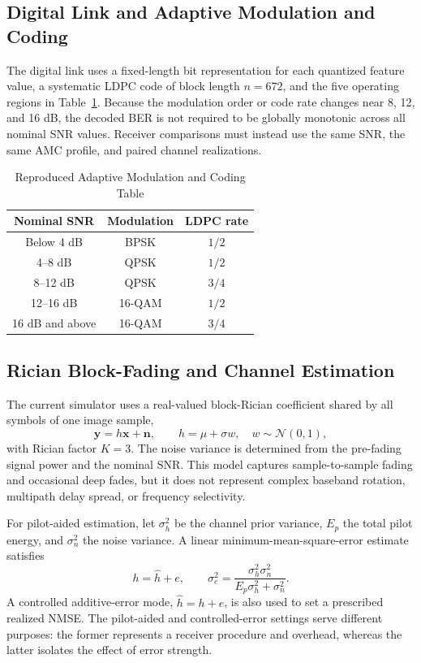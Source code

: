 \documentclass[conference]{IEEEtran}
\newcommand{\BER}{BER}
\newcommand{\NMSE}{NMSE}
\newcommand{\LDPC}{LDPC}
\newcommand{\AMC}{AMC}
\begin{document}
\subsection{Digital Link and Adaptive Modulation and Coding}
The digital link uses a fixed-length bit representation for each quantized feature value, a systematic \LDPC{} code of block length $n=672$, and the five operating regions in Table~\ref{tab:amc}. Because the modulation order or code rate changes near 8, 12, and 16 dB, the decoded \BER{} is not required to be globally monotonic across all nominal SNR values. Receiver comparisons must instead use the same SNR, the same \AMC{} profile, and paired channel realizations.

\begin{table}[t]
\centering
\caption{Reproduced Adaptive Modulation and Coding Table}
\label{tab:amc}
\begin{tabular}{c c c}
\toprule
Nominal SNR & Modulation & \LDPC{} rate \\
\midrule
Below 4 dB & BPSK & $1/2$ \\
4--8 dB & QPSK & $1/2$ \\
8--12 dB & QPSK & $3/4$ \\
12--16 dB & 16-QAM & $1/2$ \\
16 dB and above & 16-QAM & $3/4$ \\
\bottomrule
\end{tabular}
\end{table}

\subsection{Rician Block-Fading and Channel Estimation}
The current simulator uses a real-valued block-Rician coefficient shared by all symbols of one image sample,
\begin{equation}
    \bm y=h\bm x+\bm n,
    \qquad
    h=\mu+\sigma w,
    \quad w\sim\mathcal N(0,1),
    \label{eq:rician}
\end{equation}
with Rician factor $K=3$. The noise variance is determined from the pre-fading signal power and the nominal SNR. This model captures sample-to-sample fading and occasional deep fades, but it does not represent complex baseband rotation, multipath delay spread, or frequency selectivity.

For pilot-aided estimation, let $\sigma_h^2$ be the channel prior variance, $E_p$ the total pilot energy, and $\sigma_n^2$ the noise variance. A linear minimum-mean-square-error estimate satisfies
\begin{equation}
    h=\hat h+e,
    \qquad
    \sigma_e^2=
    \frac{\sigma_h^2\sigma_n^2}
    {E_p\sigma_h^2+\sigma_n^2}.
    \label{eq:lmmse-error}
\end{equation}
A controlled additive-error mode, $\hat h=h+e$, is also used to set a prescribed realized \NMSE{}. The pilot-aided and controlled-error settings serve different purposes: the former represents a receiver procedure and overhead, whereas the latter isolates the effect of error strength.
\end{document}
